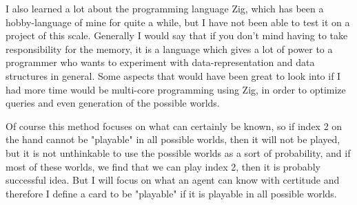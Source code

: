 I also learned a lot about the programming language Zig, which has been a hobby-language of mine for quite a while, but I have not been able to test it on a project of this scale. Generally I would say that if you don't mind having to take responsibility for the memory, it is a language which gives a lot of power to a programmer who wants to experiment with data-representation and data structures in general. Some aspects that would have been great to look into if I had more time would be multi-core programming using Zig, in order to optimize queries and even generation of the possible worlds.

Of course this method focuses on what can certainly be known, so if index 2 on the hand cannot be "playable" in all possible worlds, then it will not be played, but it is not unthinkable to use the possible worlds as a sort of probability, and if most of these worlds, we find that we can play index 2, then it is probably successful idea. But I will focus on what an agent can know with certitude and therefore I define a card to be "playable" if it is playable in all possible worlds.



